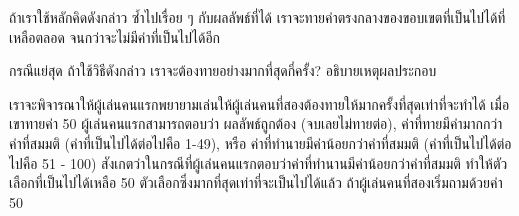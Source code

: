 ถ้า{\wbr}เรา{\wbr}ใช้{\wbr}หลัก{\wbr}คิด{\wbr}ดังกล่าว ซ้ำ{\wbr}ไป{\wbr}เรื่อย ๆ กับ{\wbr}ผลลัพธ์{\wbr}ที่{\wbr}ได้{\wbr}
เรา{\wbr}จะ{\wbr}ทาย{\wbr}ค่า{\wbr}ตรง{\wbr}กลาง{\wbr}ของ{\wbr}ขอบเขต{\wbr}ที่{\wbr}เป็น{\wbr}ไป{\wbr}ได้{\wbr}ที่{\wbr}เหลือ{\wbr}ตลอด จนกว่า{\wbr}จะ{\wbr}ไม่{\wbr}มี{\wbr}ค่า{\wbr}ที่{\wbr}เป็น{\wbr}ไป{\wbr}ได้{\wbr}อีก{\wbr}

\begin{quiz}{กรณี{\wbr}แย่{\wbr}สุด}
ถ้า{\wbr}ใช้{\wbr}วิธี{\wbr}ดังกล่าว เรา{\wbr}จะ{\wbr}ต้อง{\wbr}ทาย{\wbr}อย่าง{\wbr}มาก{\wbr}ที่สุด{\wbr}กี่{\wbr}ครั้ง?  อธิบาย{\wbr}เหตุผล{\wbr}ประกอบ{\wbr}
\end{quiz}
\begin{quizans}
เรา{\wbr}จะ{\wbr}พิจารณา{\wbr}ให้{\wbr}ผู้{\wbr}เล่น{\wbr}คน{\wbr}แรก{\wbr}พยายาม{\wbr}เล่น{\wbr}ให้{\wbr}ผู้{\wbr}เล่น{\wbr}คน{\wbr}ที่{\wbr}สอง{\wbr}ต้อง{\wbr}ทาย{\wbr}ให้{\wbr}มาก{\wbr}ครั้ง{\wbr}ที่สุด{\wbr}เท่า{\wbr}ที่{\wbr}จะ{\wbr}ทำ{\wbr}ได้{\wbr}
เมื่อ{\wbr}เขา{\wbr}ทาย{\wbr}ค่า 50 ผู้{\wbr}เล่น{\wbr}คน{\wbr}แรก{\wbr}สามารถ{\wbr}ตอบ{\wbr}ว่า ผลลัพธ์{\wbr}ถูกต้อง (จบ{\wbr}เลย{\wbr}ไม่{\wbr}ทาย{\wbr}ต่อ),
ค่า{\wbr}ที่{\wbr}ทาย{\wbr}มี{\wbr}ค่า{\wbr}มาก{\wbr}กว่า{\wbr}ค่า{\wbr}ที่{\wbr}สมมติ (ค่า{\wbr}ที่{\wbr}เป็น{\wbr}ไป{\wbr}ได้{\wbr}ต่อไป{\wbr}คือ 1-49), หรือ{\wbr}
ค่า{\wbr}ที่{\wbr}ทำนาย{\wbr}มี{\wbr}ค่า{\wbr}น้อย{\wbr}กว่า{\wbr}ค่า{\wbr}ที่{\wbr}สมมติ (ค่า{\wbr}ที่{\wbr}เป็น{\wbr}ไป{\wbr}ได้{\wbr}ต่อไป{\wbr}คือ 51 - 100)
สังเกต{\wbr}ว่า{\wbr}ใน{\wbr}กรณี{\wbr}ที่{\wbr}ผู้{\wbr}เล่น{\wbr}คน{\wbr}แรก{\wbr}ตอบ{\wbr}ว่า{\wbr}ค่า{\wbr}ที่{\wbr}ทำ{\wbr}นาน{\wbr}มี{\wbr}ค่า{\wbr}น้อย{\wbr}กว่า{\wbr}ค่า{\wbr}ที่{\wbr}สมมติ{\wbr}
ทำ{\wbr}ให้{\wbr}ตัวเลือก{\wbr}ที่{\wbr}เป็น{\wbr}ไป{\wbr}ได้{\wbr}เหลือ 50 ตัวเลือก{\wbr}ซึ่ง{\wbr}มาก{\wbr}ที่สุด{\wbr}เท่า{\wbr}ที่{\wbr}จะ{\wbr}เป็น{\wbr}ไป{\wbr}ได้{\wbr}แล้ว{\wbr}
ถ้า{\wbr}ผู้{\wbr}เล่น{\wbr}คน{\wbr}ที่{\wbr}สอง{\wbr}เริ่ม{\wbr}ถาม{\wbr}ด้วย{\wbr}ค่า 50


\end{quizans}
